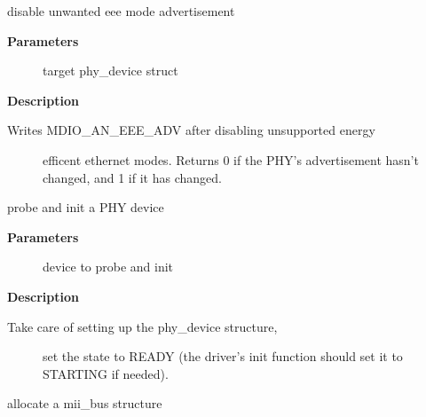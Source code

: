 \documentclass[a4paper,8pt,english]{sphinxmanual}
\begin{document}
\begin{fulllineitems}
\label{networking/kapi:c.genphy_config_eee_advert}
disable unwanted eee mode advertisement

\end{fulllineitems}


\textbf{Parameters}
\begin{description}
\item[{}] \leavevmode
target phy\_device struct

\end{description}

\textbf{Description}
\begin{description}
\item[{Writes MDIO\_AN\_EEE\_ADV after disabling unsupported energy}] \leavevmode
efficent ethernet modes. Returns 0 if the PHY's advertisement hasn't
changed, and 1 if it has changed.

\end{description}

\begin{fulllineitems}
\label{networking/kapi:c.phy_probe}
probe and init a PHY device

\end{fulllineitems}


\textbf{Parameters}
\begin{description}
\item[{}] \leavevmode
device to probe and init

\end{description}

\textbf{Description}
\begin{description}
\item[{Take care of setting up the phy\_device structure,}] \leavevmode
set the state to READY (the driver's init function should
set it to STARTING if needed).

\end{description}

\begin{fulllineitems}
\label{networking/kapi:c.mdiobus_alloc_size}
allocate a mii\_bus structure

\end{fulllineitems}
\end{document}
